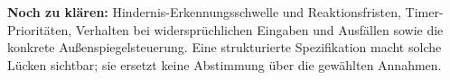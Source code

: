 \begin{loesung}
\textbf{Noch zu klären:} Hindernis-Erkennungsschwelle und Reaktionsfristen, Timer-Prioritäten, Verhalten bei widersprüchlichen Eingaben und Ausfällen sowie die konkrete Außenspiegelsteuerung. Eine strukturierte Spezifikation macht solche Lücken sichtbar; sie ersetzt keine Abstimmung über die gewählten Annahmen.
\end{loesung}


